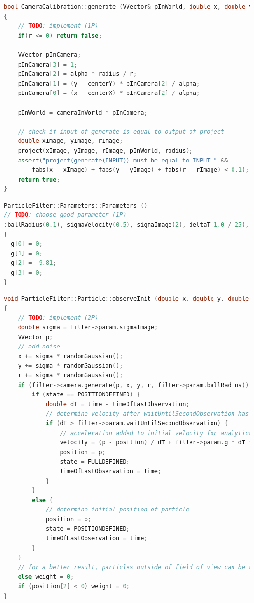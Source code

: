 \documentclass{ezb}
\begin{document}
\begin{lstlisting}[language=C++, caption=Compute the world position of an image sphere]
bool CameraCalibration::generate (VVector& pInWorld, double x, double y, double r, double radius) const
{
	// TODO: implement (1P)
	if(r <= 0) return false;

	VVector pInCamera;
	pInCamera[3] = 1;
	pInCamera[2] = alpha * radius / r;
	pInCamera[1] = (y - centerY) * pInCamera[2] / alpha;
	pInCamera[0] = (x - centerX) * pInCamera[2] / alpha;

	pInWorld = cameraInWorld * pInCamera;

	// check if input of generate is equal to output of project
	double xImage, yImage, rImage;
	project(xImage, yImage, rImage, pInWorld, radius);
	assert("project(generate(INPUT)) must be equal to INPUT!" && 
		fabs(x - xImage) + fabs(y - yImage) + fabs(r - rImage) < 0.1);
	return true;
}
\end{lstlisting}

\begin{lstlisting}[language=C++, caption=The parameters used by this algorithm]
ParticleFilter::Parameters::Parameters ()
// TODO: choose good parameter (1P)
:ballRadius(0.1), sigmaVelocity(0.5), sigmaImage(2), deltaT(1.0 / 25), waitUntilSecondObservation(3.0 / 25), nrOfParticles(200)
{
  g[0] = 0;
  g[1] = 0;  
  g[2] = -9.81;
  g[3] = 0;
}
\end{lstlisting}

\begin{lstlisting}[language=C++, caption=Integrate an observation of the ball during initialization]
void ParticleFilter::Particle::observeInit (double x, double y, double r)
{
	// TODO: implement (2P)
	double sigma = filter->param.sigmaImage;
	VVector p;
	// add noise
	x += sigma * randomGaussian();
	y += sigma * randomGaussian();
	r += sigma * randomGaussian();
	if (filter->camera.generate(p, x, y, r, filter->param.ballRadius)) {
		if (state == POSITIONDEFINED) {
			double dT = time - timeOfLastObservation;
			// determine velocity after waitUntilSecondObservation has passed
			if (dT > filter->param.waitUntilSecondObservation) {
				// acceleration added to initial velocity for analytical approach
				velocity = (p - position) / dT + filter->param.g * dT * .5;
				position = p;
				state = FULLDEFINED;
				timeOfLastObservation = time;
			}
		}
		else {
			// determine initial position of particle
			position = p;
			state = POSITIONDEFINED;
			timeOfLastObservation = time;
		}
	}
	// for a better result, particles outside of field of view can be already winthdrawn in the initialization
	else weight = 0;
	if (position[2] < 0) weight = 0;
}
\end{lstlisting}
\end{document}
